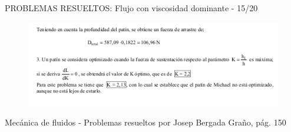 \begin{frame}{PROBLEMAS RESUELTOS: Flujo con viscosidad dominante - 15/20}
\justifying
\begin{figure}[H]
\centering
\includegraphics[scale=0.5]{Section_Files/S2-imagenes-Jhon/Book-ProbResuelts/P40-E05.png}
\end{figure}
{\tiny Mecánica de fluidos - Problemas resueltos por Josep Bergada Graño, pág. 150}
\end{frame}
